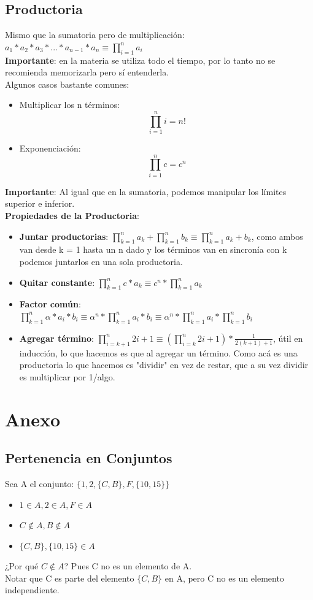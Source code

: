 \documentclass[10pt,a4paper]{article}
\begin{document}
\subsection*{Productoria}
Mismo que la sumatoria pero de multiplicación: $ a_{1} \ast a_{2} \ast a_{3} \ast ... \ast a_{n-1} \ast a_{n} \equiv \prod_{i=1}^{n}{a_{i}}$ \\
\textbf{Importante}: en la materia se utiliza todo el tiempo, por lo tanto no se recomienda memorizarla pero sí entenderla. \\
Algunos casos bastante comunes:
\begin{itemize}
    \item Multiplicar los n términos: \[\prod_{i=1}^{n}{i} = n!\]
    \item Exponenciación: \[\prod_{i=1}^{n}{c} = c^{n}\]
\end{itemize}
\textbf{Importante}: Al igual que en la sumatoria, podemos manipular los límites superior e inferior. \\
\textbf{Propiedades de la Productoria}: 
\begin{itemize}
    \item \textbf{Juntar productorias}: $\prod_{k=1}^{n}{a_{k}} + \prod_{k=1}^{n}{b_{k}}  \equiv \prod_{k=1}^{n}{a_{k} + b_{k}} $, como ambos van desde k = 1 hasta un n dado y los términos van en sincronía con k podemos juntarlos en una sola productoria.
    \item \textbf{Quitar constante}: $\prod_{k=1}^{n}{c \ast a_{k}} \equiv c^{n} \ast \prod_{k=1}^{n}{a_{k}}$
    \item \textbf{Factor común}: $\prod_{k=1}^{n}{\alpha \ast a_{i} \ast b_{i}} \equiv  \alpha^{n} \ast \prod_{k=1}^{n}{a_{i} \ast b_{i}} \equiv \alpha^{n} \ast \prod_{k=1}^{n}{a_{i}} \ast \prod_{k=1}^{n}{b_{i}} $
    \item \textbf{Agregar término}: $\prod_{i=k+1}^{n}{2i+1} \equiv (\prod_{i=k}^{n}{2i+1}) \ast \frac{1}{2(k+1)+1}$, útil en inducción, lo que hacemos es que al agregar un término. Como acá es una productoria lo que hacemos es "dividir" en vez de restar, que a su vez dividir es multiplicar por 1/algo.
\end{itemize}
\section*{Anexo}
\subsection*{Pertenencia en Conjuntos}
\label{subsec:pertenecencia_conjuntos}
Sea A el conjunto: $\{1, 2, \{C, B\}, F, \{10, 15\}\}$
\begin{itemize}
    \item $ 1 \in A, 2 \in A, F \in A $
    \item $ C \notin A, B \notin A $
    \item $  \{C, B\}, \{10, 15\} \in A $
\end{itemize}
¿Por qué $C \notin A$? Pues C no es un elemento de A.\\ Notar que C es parte del elemento $\{C, B\}$ en A, pero C no es un elemento independiente.
\end{document}
